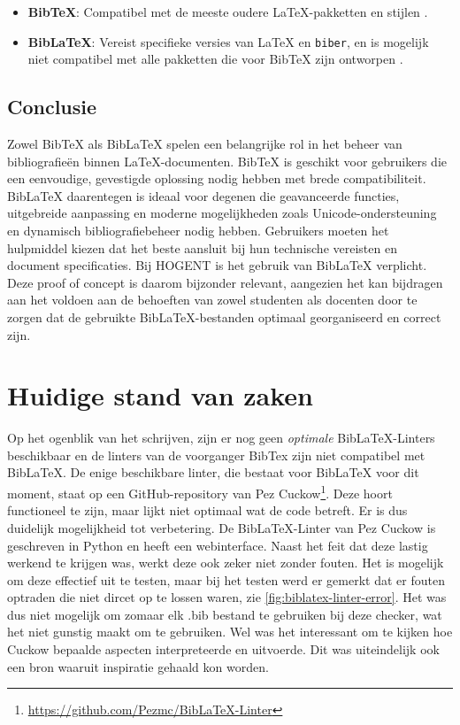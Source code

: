 \begin{itemize}
    \item \textbf{BibTeX}: Compatibel met de meeste oudere \LaTeX{}-pakketten en stijlen \autocite{Patashnik1988}.
    \item \textbf{BibLaTeX}: Vereist specifieke versies van \LaTeX{} en \texttt{biber}, en is mogelijk niet compatibel met alle pakketten die voor BibTeX zijn ontworpen \autocite{Kime2024}.
\end{itemize}

\subsection{Conclusie}
Zowel BibTeX als BibLaTeX spelen een belangrijke rol in het beheer van bibliografieën binnen \LaTeX{}-documenten. BibTeX is geschikt voor gebruikers die een eenvoudige, gevestigde oplossing nodig hebben met brede compatibiliteit. BibLaTeX daarentegen is ideaal voor degenen die geavanceerde functies, uitgebreide aanpassing en moderne mogelijkheden zoals Unicode-ondersteuning en dynamisch bibliografiebeheer nodig hebben. Gebruikers moeten het hulpmiddel kiezen dat het beste aansluit bij hun technische vereisten en document specificaties. Bij HOGENT is het gebruik van BibLaTeX verplicht. Deze proof of concept is daarom bijzonder relevant, aangezien het kan bijdragen aan het voldoen aan de behoeften van zowel studenten als docenten door te zorgen dat de gebruikte BibLaTeX-bestanden optimaal georganiseerd en correct zijn.

\section{Huidige stand van zaken}
Op het ogenblik van het schrijven, zijn er nog geen \emph{optimale} BibLaTeX-Linters beschikbaar en de linters van de voorganger BibTex zijn niet compatibel met BibLaTeX. De enige beschikbare linter, die bestaat voor BibLaTeX voor dit moment, staat op een GitHub-repository van Pez Cuckow\footnote{\label{foot:pezgithub}\url{https://github.com/Pezmc/BibLaTeX-Linter}}. Deze hoort functioneel te zijn, maar lijkt niet optimaal wat de code betreft. Er is dus duidelijk mogelijkheid tot verbetering. De BibLaTeX-Linter van Pez Cuckow is geschreven in Python en heeft een webinterface. Naast het feit dat deze lastig werkend te krijgen was, werkt deze ook zeker niet zonder fouten. Het is mogelijk om deze effectief uit te testen, maar bij het testen werd er gemerkt dat er fouten optraden die niet dircet op te lossen waren, zie \ref{fig:biblatex-linter-error}. Het was dus niet mogelijk om zomaar elk .bib bestand te gebruiken bij deze checker, wat het niet gunstig maakt om te gebruiken. Wel was het interessant om te kijken hoe Cuckow bepaalde aspecten interpreteerde en uitvoerde. Dit was uiteindelijk ook een bron waaruit inspiratie gehaald kon worden.

